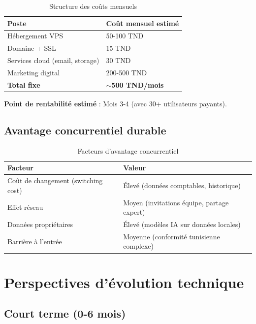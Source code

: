 \begin{table}[H]
\centering
\caption{Structure des coûts mensuels}
\label{tab:costs}
\begin{tabular}{|l|l|}
\hline
\textbf{Poste} & \textbf{Coût mensuel estimé} \\
\hline
Hébergement VPS & 50-100 TND \\
\hline
Domaine + SSL & 15 TND \\
\hline
Services cloud (email, storage) & 30 TND \\
\hline
Marketing digital & 200-500 TND \\
\hline
\textbf{Total fixe} & \textbf{$\sim$500 TND/mois} \\
\hline
\end{tabular}
\end{table}

\textbf{Point de rentabilité estimé} : Mois 3-4 (avec 30+ utilisateurs payants).

\subsection{Avantage concurrentiel durable}

\begin{table}[H]
\centering
\caption{Facteurs d'avantage concurrentiel}
\label{tab:competitive}
\begin{tabular}{|l|l|}
\hline
\textbf{Facteur} & \textbf{Valeur} \\
\hline
Coût de changement (switching cost) & Élevé (données comptables, historique) \\
\hline
Effet réseau & Moyen (invitations équipe, partage expert) \\
\hline
Données propriétaires & Élevé (modèles IA sur données locales) \\
\hline
Barrière à l'entrée & Moyenne (conformité tunisienne complexe) \\
\hline
\end{tabular}
\end{table}

\section{Perspectives d'évolution technique}

\subsection{Court terme (0-6 mois)}

